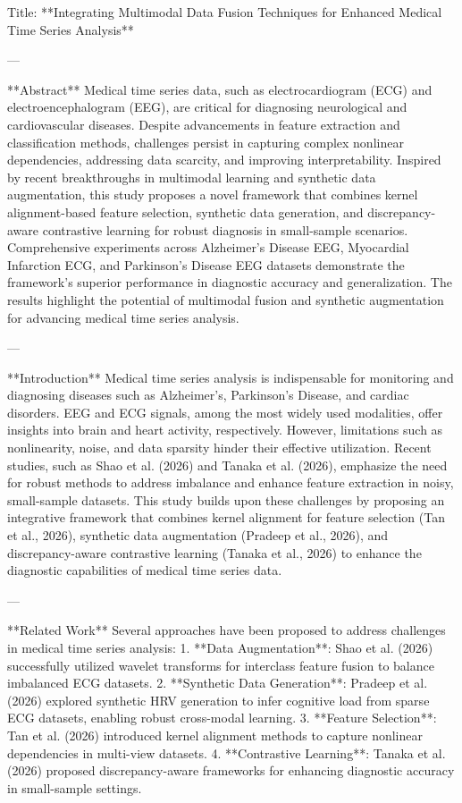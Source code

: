 Title: **Integrating Multimodal Data Fusion Techniques for Enhanced Medical Time Series Analysis**

---

**Abstract**  
Medical time series data, such as electrocardiogram (ECG) and electroencephalogram (EEG), are critical for diagnosing neurological and cardiovascular diseases. Despite advancements in feature extraction and classification methods, challenges persist in capturing complex nonlinear dependencies, addressing data scarcity, and improving interpretability. Inspired by recent breakthroughs in multimodal learning and synthetic data augmentation, this study proposes a novel framework that combines kernel alignment-based feature selection, synthetic data generation, and discrepancy-aware contrastive learning for robust diagnosis in small-sample scenarios. Comprehensive experiments across Alzheimer's Disease EEG, Myocardial Infarction ECG, and Parkinson's Disease EEG datasets demonstrate the framework's superior performance in diagnostic accuracy and generalization. The results highlight the potential of multimodal fusion and synthetic augmentation for advancing medical time series analysis.  

---

**Introduction**  
Medical time series analysis is indispensable for monitoring and diagnosing diseases such as Alzheimer's, Parkinson’s Disease, and cardiac disorders. EEG and ECG signals, among the most widely used modalities, offer insights into brain and heart activity, respectively. However, limitations such as nonlinearity, noise, and data sparsity hinder their effective utilization. Recent studies, such as Shao et al. (2026) and Tanaka et al. (2026), emphasize the need for robust methods to address imbalance and enhance feature extraction in noisy, small-sample datasets. This study builds upon these challenges by proposing an integrative framework that combines kernel alignment for feature selection (Tan et al., 2026), synthetic data augmentation (Pradeep et al., 2026), and discrepancy-aware contrastive learning (Tanaka et al., 2026) to enhance the diagnostic capabilities of medical time series data.

---

**Related Work**  
Several approaches have been proposed to address challenges in medical time series analysis:  
1. **Data Augmentation**: Shao et al. (2026) successfully utilized wavelet transforms for interclass feature fusion to balance imbalanced ECG datasets.  
2. **Synthetic Data Generation**: Pradeep et al. (2026) explored synthetic HRV generation to infer cognitive load from sparse ECG datasets, enabling robust cross-modal learning.  
3. **Feature Selection**: Tan et al. (2026) introduced kernel alignment methods to capture nonlinear dependencies in multi-view datasets.  
4. **Contrastive Learning**: Tanaka et al. (2026) proposed discrepancy-aware frameworks for enhancing diagnostic accuracy in small-sample settings.  

